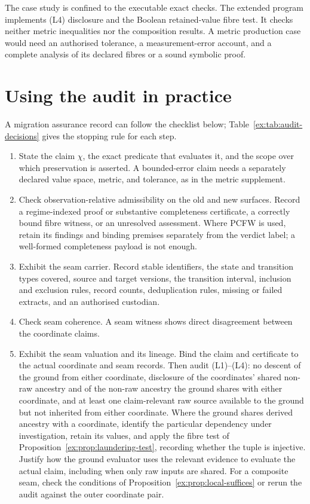 \documentclass[smallextended,envcountsect,envcountsame,natbib]{svjour3}
\begin{document}
The case study is confined to the executable exact checks. The extended program implements (L4) disclosure and the Boolean retained-value fibre test. It checks neither metric inequalities nor the composition results. A metric production case would need an authorised tolerance, a measurement-error account, and a complete analysis of its declared fibres or a sound symbolic proof.

\section{Using the audit in practice}\label{ex:sec:practice}
A migration assurance record can follow the checklist below; Table~\ref{ex:tab:audit-decisions} gives the stopping rule for each step.
\begin{enumerate}
\item State the claim $\chi$, the exact predicate that evaluates it, and the scope over which preservation is asserted. A bounded-error claim needs a separately declared value space, metric, and tolerance, as in the metric supplement.
\item Check observation-relative admissibility on the old and new surfaces. Record a regime-indexed proof or substantive completeness certificate, a correctly bound fibre witness, or an unresolved assessment. Where PCFW is used, retain its findings and binding premises separately from the verdict label; a well-formed completeness payload is not enough.
\item Exhibit the seam carrier. Record stable identifiers, the state and transition types covered, source and target versions, the transition interval, inclusion and exclusion rules, record counts, deduplication rules, missing or failed extracts, and an authorised custodian.
\item Check seam coherence. A seam witness shows direct disagreement between the coordinate claims.
\item Exhibit the seam valuation and its lineage. Bind the claim and certificate to the actual coordinate and seam records. Then audit (L1)--(L4): no descent of the ground from either coordinate, disclosure of the coordinates' shared non-raw ancestry and of the non-raw ancestry the ground shares with either coordinate, and at least one claim-relevant raw source available to the ground but not inherited from either coordinate. Where the ground shares derived ancestry with a coordinate, identify the particular dependency under investigation, retain its values, and apply the fibre test of Proposition~\ref{ex:prop:laundering-test}, recording whether the tuple is injective. Justify how the ground evaluator uses the relevant evidence to evaluate the actual claim, including when only raw inputs are shared. For a composite seam, check the conditions of Proposition~\ref{ex:prop:local-suffices} or rerun the audit against the outer coordinate pair.

\end{enumerate}
\end{document}
